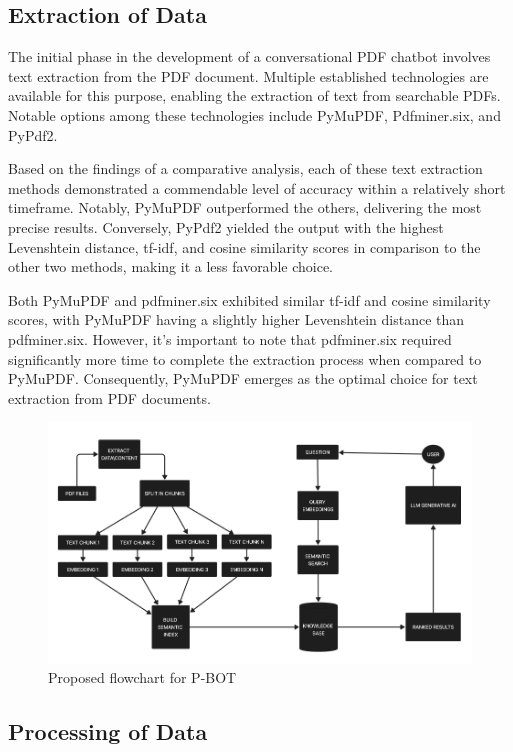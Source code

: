\documentclass[conference]{IEEEtran}
\begin{document}
\subsection{Extraction of Data}

The initial phase in the development of a conversational PDF chatbot involves text extraction from the PDF document. Multiple established technologies are available for this purpose, enabling the extraction of text from searchable PDFs. Notable options among these technologies include PyMuPDF, Pdfminer.six, and PyPdf2.

Based on the findings of a comparative analysis, each of these text extraction methods demonstrated a commendable level of accuracy within a relatively short timeframe. Notably, PyMuPDF outperformed the others, delivering the most precise results. Conversely, PyPdf2 yielded the output with the highest Levenshtein distance, tf-idf, and cosine similarity scores in comparison to the other two methods, making it a less favorable choice.

Both PyMuPDF and pdfminer.six exhibited similar tf-idf and cosine similarity scores, with PyMuPDF having a slightly higher Levenshtein distance than pdfminer.six. However, it's important to note that pdfminer.six required significantly more time to complete the extraction process when compared to PyMuPDF. Consequently, PyMuPDF emerges as the optimal choice for text extraction from PDF documents.

\begin{figure}
    \centering
    \includegraphics[width=\textwidth]{FLOWC}
    \caption{Proposed flowchart for P-BOT}
    \label{fig:your_image_label}
\end{figure}

\subsection{Processing of Data}
\end{document}
